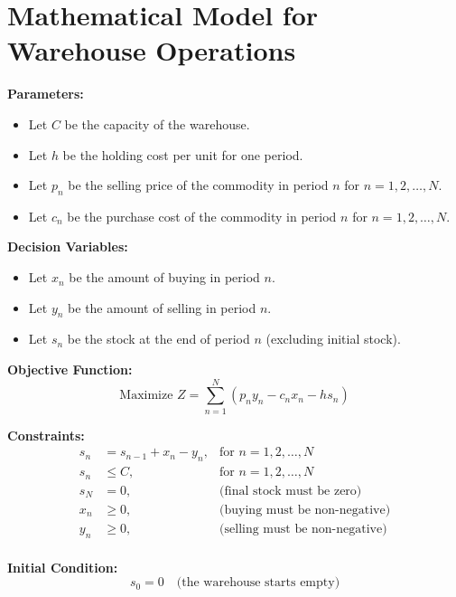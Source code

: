 \documentclass{article}
\begin{document}
\section*{Mathematical Model for Warehouse Operations}

\textbf{Parameters:}
\begin{itemize}
    \item Let \( C \) be the capacity of the warehouse.
    \item Let \( h \) be the holding cost per unit for one period.
    \item Let \( p_n \) be the selling price of the commodity in period \( n \) for \( n = 1, 2, \ldots, N \).
    \item Let \( c_n \) be the purchase cost of the commodity in period \( n \) for \( n = 1, 2, \ldots, N \).
\end{itemize}

\textbf{Decision Variables:}
\begin{itemize}
    \item Let \( x_n \) be the amount of buying in period \( n \).
    \item Let \( y_n \) be the amount of selling in period \( n \).
    \item Let \( s_n \) be the stock at the end of period \( n \) (excluding initial stock).
\end{itemize}

\textbf{Objective Function:}
\[
\text{Maximize } Z = \sum_{n=1}^{N} (p_n y_n - c_n x_n - h s_n)
\]

\textbf{Constraints:}
\begin{align*}
    s_n &= s_{n-1} + x_n - y_n, & \text{for } n = 1, 2, \ldots, N \\
    s_n &\leq C, & \text{for } n = 1, 2, \ldots, N \\
    s_N &= 0, & \text{(final stock must be zero)} \\
    x_n &\geq 0, & \text{(buying must be non-negative)} \\
    y_n &\geq 0, & \text{(selling must be non-negative)} \\
\end{align*}

\textbf{Initial Condition:}
\[
s_0 = 0 \quad \text{(the warehouse starts empty)}
\]
\end{document}
